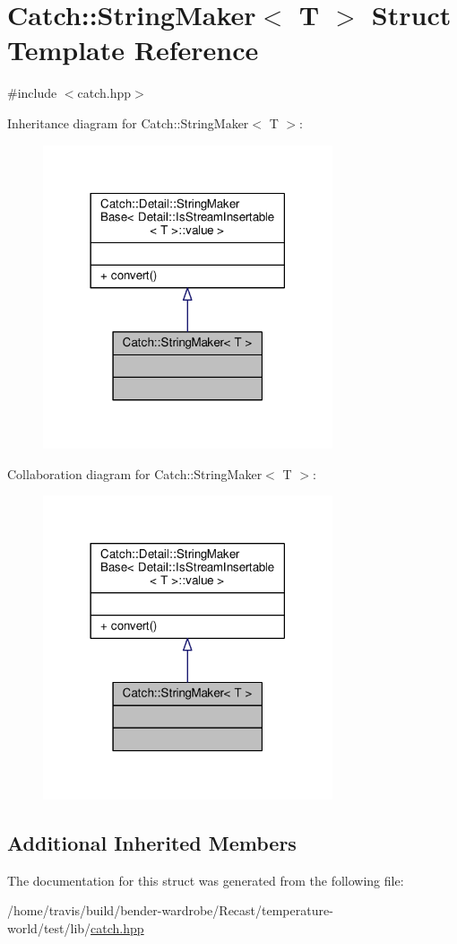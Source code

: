\hypertarget{struct_catch_1_1_string_maker}{\section{Catch\-:\-:String\-Maker$<$ T $>$ Struct Template Reference}
\label{struct_catch_1_1_string_maker}
}


{\ttfamily \#include $<$catch.\-hpp$>$}



Inheritance diagram for Catch\-:\-:String\-Maker$<$ T $>$\-:
\nopagebreak
\begin{figure}[H]
\begin{center}
\leavevmode
\includegraphics[width=242pt]{struct_catch_1_1_string_maker__inherit__graph}
\end{center}
\end{figure}


Collaboration diagram for Catch\-:\-:String\-Maker$<$ T $>$\-:
\nopagebreak
\begin{figure}[H]
\begin{center}
\leavevmode
\includegraphics[width=242pt]{struct_catch_1_1_string_maker__coll__graph}
\end{center}
\end{figure}
\subsection*{Additional Inherited Members}


The documentation for this struct was generated from the following file\-:\begin{DoxyCompactItemize}
\item 
/home/travis/build/bender-\/wardrobe/\-Recast/temperature-\/world/test/lib/\hyperlink{catch_8hpp}{catch.\-hpp}\end{DoxyCompactItemize}
